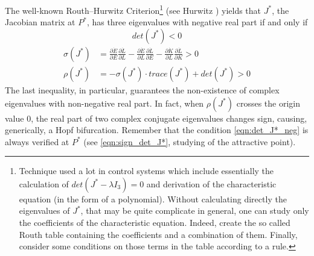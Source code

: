 The well-known Routh–Hurwitz Criterion\footnote{Technique used a lot in control systems which include essentially the calculation of $det(J^*-\lambda I_3)=0$ and derivation of the characteristic equation (in the form of a polynomial). Without calculating directly the eigenvalues of $J^*$, that may be quite complicate in general, one can study only the coefficients of the characteristic equation. Indeed, create the so called Routh table containing the coefficients and a combination of them. Finally, consider some conditions on those terms in the table according to a rule.} (see Hurwitz \cite{hurwitz_conditions_1964}) yields that $J^*$, the Jacobian matrix at $P^*$, has three eigenvalues with negative real part if and only if
\begin{equation} \label{eqn:det_J*_neg}
	det(J^*)<0
\end{equation}
\begin{equation} \label{eqn:cond_sigma_rho_stab}
	\begin{split}
		\sigma(J^*) &= \frac{\partial\dot{E}}{\partial E}\frac{\partial\dot{L}}{\partial L}-\frac{\partial\dot{E}}{\partial L}\frac{\partial\dot{L}}{\partial E}-\frac{\partial\dot{K}}{\partial L}\frac{\partial\dot{L}}{\partial K}>0\\
		\rho(J^*) &= -\sigma(J^*)\cdot trace(J^*)+det(J^*)>0
	\end{split}
\end{equation}
The last inequality, in particular, guarantees the non-existence of complex eigenvalues with non-negative real part. In fact, when $\rho(J^*)$ crosses the origin value $0$, the real part of two complex conjugate eigenvalues changes sign, causing, generically, a Hopf bifurcation. Remember that the condition \eqref{eqn:det_J*_neg} is always verified at $P^*$ (see \eqref{eqn:sign_det_J*}, studying of the attractive point).

